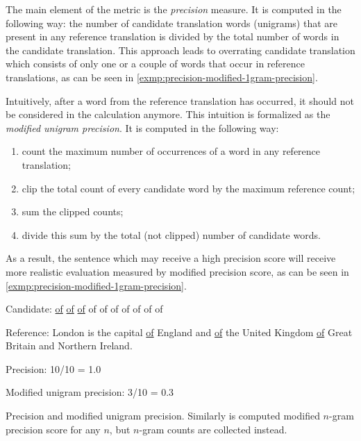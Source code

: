 The main element of the metric is the \textit{precision} measure.
It is computed in the following way:
the number of candidate translation words (unigrams) that are present in
any reference translation is divided by the total number of words in the candidate translation.
This approach leads to overrating candidate translation which consists of only one
or a couple of words that occur in reference translations, as can be seen in
\cref{exmp:precision-modified-1gram-precision}.

Intuitively, after a word from the reference translation has occurred,
it should not be considered in the calculation anymore.
This intuition is formalized as the \textit{modified unigram precision}.
It is computed in the following way:
\begin{enumerate}
	\item count the maximum number of occurrences of a word in any reference translation;
	\item clip the total count of every candidate word by the maximum reference count;
	\item sum the clipped counts;
	\item divide this sum by the total (not clipped) number of candidate words.
\end{enumerate}
As a result, the sentence which may receive a high precision score will receive
more realistic evaluation measured by modified precision score, as can be seen in
\cref{exmp:precision-modified-1gram-precision}.

\vspace{\baselineskip}
\begin{minipage}{0.9\textwidth}

	Candidate: \underline{of} \underline{of} \underline{of} of of of of of of of

	Reference: London is the capital \underline{of} England and \underline{of} the United Kingdom
	\underline{of} Great Britain and Northern Ireland.

	Precision: 10/10 = 1.0

	Modified unigram precision: 3/10 = 0.3

	\begin{exmp}
	Precision and modified unigram precision.
	Similarly is computed modified $n$-gram precision score for any $n$,
	but $n$-gram counts are collected instead.
	\label{exmp:precision-modified-1gram-precision}
	\end{exmp}

\end{minipage}
\vspace{\baselineskip}

